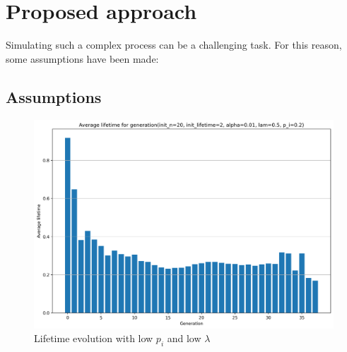 \documentclass[conference]{IEEEtran}
\begin{document}


\section{Proposed approach}

    Simulating such a complex process can be a challenging task. For this reason, some assumptions have been made:

    \subsection{Assumptions}

    \begin{figure}[!b]
        \centering
        \includegraphics[width=\columnwidth]{media/in_p_20_in_lt_2_a_0.01_l_0.5_p_i_0.2/lf.png}
        \caption[short]{Lifetime evolution with low $p_i$ and low $\lambda$}
        \label{fig:lf_low}
    \end{figure}
\end{document}
